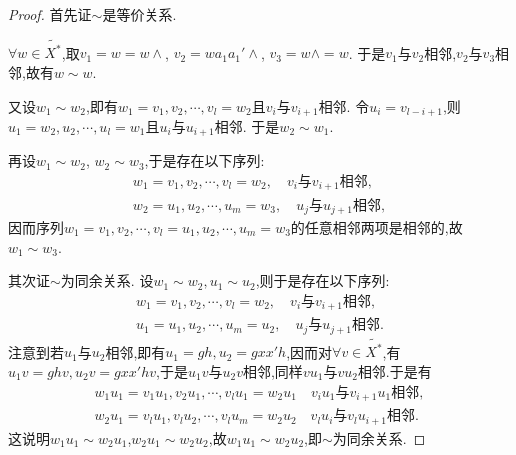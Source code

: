 \documentclass[../../main.tex]{subfiles}%
\begin{document}
\begin{proof}

首先证$\sim$是等价关系.

$\forall w\in \widetilde{X^*}$,取$v_1=w=w\land$, $v_2=wa_1a_1'\land$, $v_3=w\land=w$. 于是$v_1$与$v_2$相邻,$v_2$与$v_3$相邻,故有$w\sim w$.

又设$w_1\sim w_2$,即有$w_1=v_1,v_2,\cdots,v_l=w_2$且$v_i$与$v_{i+1}$相邻. 令$u_i=v_{l-i+1}$,则$u_1=w_2,u_2,\cdots,u_l=w_1$且$u_i$与$u_{i+1}$相邻. 于是$w_2\sim w_1$.

再设$w_1\sim w_2$, $w_2\sim w_3$,于是存在以下序列:
\begin{align*}
w_1 = v_1, v_2, \cdots, v_l = w_2,\quad v_i\text{与}v_{i+1}\text{相邻}, \\
w_2 = u_1, u_2, \cdots, u_m = w_3,\quad u_j\text{与}u_{j+1}\text{相邻},
\end{align*}
因而序列$w_1 = v_1,v_2,\cdots,v_l=u_1,u_2,\cdots,u_m=w_3$的任意相邻两项是相邻的,故$w_1\sim w_3$.

其次证$\sim$为同余关系. 设$w_1\sim w_2,u_1\sim u_2$,则于是存在以下序列:
\begin{align*}
w_1 = v_1, v_2, \cdots, v_l = w_2,\quad v_i\text{与}v_{i+1}\text{相邻}, \\
u_1 = u_1, u_2, \cdots, u_m = u_2,\quad u_j\text{与}u_{j+1}\text{相邻}.
\end{align*}
注意到若$u_1$与$u_2$相邻,即有$u_1=gh,u_2=gxx'h$,因而对$\forall v\in \tilde{X^*}$,有$u_1v=ghv,u_2v=gxx'hv$,于是$u_1v$与$u_2v$相邻,同样$vu_1$与$vu_2$相邻.于是有
\begin{gather*}
w_1u_1 = v_1u_1, v_2u_1, \cdots, v_lu_1 = w_2u_1\quad v_iu_1\text{与}v_{i+1}u_1\text{相邻},
\\
w_2u_1 = v_lu_1, v_lu_2, \cdots, v_lu_m = w_2u_2\quad v_lu_i\text{与}v_lu_{i+1}\text{相邻}.
\end{gather*}
这说明$w_1u_1\sim w_2u_1$,$w_2u_1\sim w_2u_2$,故$w_1u_1\sim w_2u_2$,即$\sim$为同余关系.


\end{proof}
\end{document}
